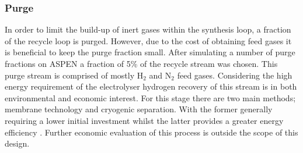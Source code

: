 \documentclass[11pt, a4paper]{article}
\newcommand\purge{5}
\begin{document}
{\subsubsection{Purge}
In order to limit the build-up of inert gases within the synthesis loop, a fraction of the recycle loop is purged. However, due to the cost of obtaining feed gases it is beneficial to keep the purge fraction small. After simulating a number of purge fractions on ASPEN a fraction of \purge \%  of the recycle stream was chosen. This purge stream is comprised of mostly H$_2$ and N$_2$ feed gases. Considering the high energy requirement of the electrolyser hydrogen recovery of this stream is in both environmental and economic interest. For this stage there are two main methods; membrane technology and cryogenic separation. With the former generally requiring a lower initial investment whilst the latter provides a greater energy efficiency \cite{Ojha2010}. Further economic evaluation of this process is outside the scope of this design.

}
\end{document}
